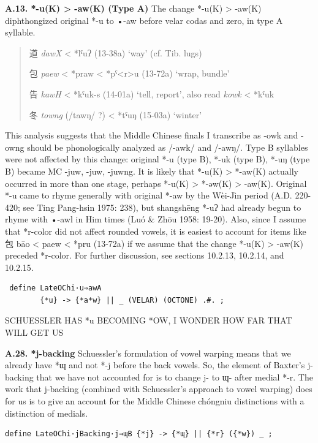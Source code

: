 \documentclass[xetex, svgnames, 12pt]{scrartcl}
\newcounter{para}
\newcommand\mypara[1]{\par\refstepcounter{para}\textbf{\thepara\space#1\space}}
\begin{document}
\mypara{A.13. *-u(K) > -aw(K) (Type A)}
 The change *-u(K) > -aw(K) diphthongized original *-u to •-aw before velar codas and
 zero, in type A syllable. 
 \begin{quote}
 
 道 %
 \textit{dawX} < *lˤuʔ (13-38a) `way' (cf. Tib. lugs)
 
 包 %
 \textit{paew} < *praw < *pˤ<r>u (13-72a) `wrap, bundle'
 
 告 %
 \textit{kawH} < *kˤuk-s (14-01a) `tell, report', also read \textit{kowk} < *kˤuk 

 冬 %
 \textit{towng} (/tawŋ/ ?) < *tˤuŋ (15-03a) `winter'
  \end{quote}
 This analysis suggests that the Middle Chinese finals I transcribe as -owk and -owng should
 be phonologically analyzed as /-awk/ and /-awŋ/.
 Type B syllables were not affected by this change: original *-u (type B), 
 *-uk (type B), *-uŋ (type B)
 became MC -juw, -juw, -juwng.
 It is likely that *-u(K) > *-aw(K) actually occurred in more than one stage, perhaps *-u(K)
 > *-əw(K) > -aw(K). Original *-u came to rhyme generally with original *-aw by the Wèi-Jìn 
 period (A.D. 220-420; see Ting Pang-hsin 1975: 238), but shangshēng *-uʔ had already
 begun to rhyme with •-awl in Him times (Luó \& Zhōu 1958: 19-20). Also, since I assume
 that *r-color did not affect rounded vowels, it is easiest to account for items like 包 bāo <
 paew < *pru (13-72a) if we assume that the change *-u(K) > -aw(K) preceded *r-color. For further
 discussion, see sections 10.2.13, 10.2.14, and 10.2.15.
 \begin{verbatim}
 define LateOChi·u⇒awA 
        {*u} -> {*a*w} || _ (VELAR) (OCTONE) .#. ;
  \end{verbatim}
 SCHUESSLER HAS *u BECOMING *OW, I WONDER HOW FAR THAT WILL GET US

\mypara{A.28. *j-backing}
 Schuessler's formulation of vowel warping means that we already have *ɰ and not *-j
 before the back vowels. So, the element of Baxter's j-backing that we have not accounted 
 for is to change j- to ɰ- after medial *-r. The work that j-backing (combined with
 Schuessler's approach to vowel warping) does for us is to give an account for the Middle
 Chinese chóngniu distinctions with a distinction of medials. 
 \begin{verbatim}
define LateOChi·jBacking·j⇒ɰB {*j} -> {*ɰ} || {*r} ({*w}) _ ; 
 \end{verbatim}
 
\end{document}
